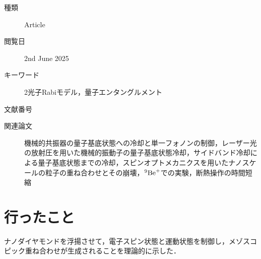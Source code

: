 \documentclass{report}
\begin{document}
  \begin{boxnote}
    \begin{description}
      \item[種類] Article
      \item[閲覧日] 2nd June 2025
      \item[キーワード] 2光子Rabiモデル，量子エンタングルメント
      \item[文献番号] \cite{PhysRevA.88.033614}
      \item[関連論文] 機械的共振器の量子基底状態への冷却と単一フォノンの制御\cite{o2010quantum}，レーザー光の放射圧を用いた機械的振動子の量子基底状態冷却\cite{chan2011laser}，サイドバンド冷却による量子基底状態までの冷却\cite{teufel2011sideband}，スピンオプトメカニクスを用いたナノスケールの粒子の重ね合わせ\cite{PhysRevLett.107.020405}とその崩壊\cite{PhysRevA.84.052121}，${}^9\ce{Be+}$での実験\cite{PhysRevLett.76.1796}，断熱操作の時間短縮\cite{PhysRevLett.104.063002}
    \end{description}
  \end{boxnote}
  \section{行ったこと}
    ナノダイヤモンドを浮揚させて，電子スピン状態と運動状態を制御し，メゾスコピック重ね合わせが生成されることを理論的に示した．
\end{document}
